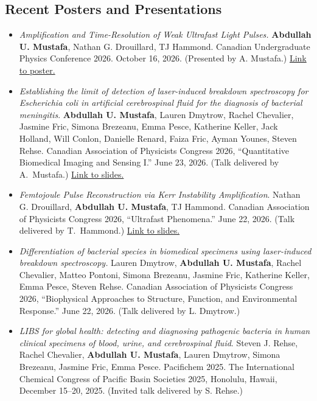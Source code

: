 \documentclass[11pt]{article}
\begin{document}
\subsection*{Recent Posters and Presentations}
\begin{itemize}
	\item \emph{Amplification and Time-Resolution of Weak Ultrafast Light Pulses.} \textbf{Abdullah U. Mustafa}, Nathan G. Drouillard, TJ Hammond. Canadian Undergraduate Physics Conference 2026. October 16, 2026. (Presented by A. Mustafa.) \href{https://aumustafa.github.io/pdfs/MustafaCUPC26.pdf}{Link to poster.}
    \item \emph{Establishing the limit of detection of laser-induced breakdown spectroscopy for \textit{Escherichia coli} in artificial cerebrospinal fluid for the diagnosis of bacterial meningitis}. \textbf{Abdullah U. Mustafa}, Lauren Dmytrow, Rachel Chevalier, Jasmine Fric, Simona Brezeanu, Emma Pesce, Katherine Keller, Jack Holland, Will Conlon, Danielle Renard, Faiza Fric, Ayman Younes, Steven Rehse. Canadian Association of Physicists Congress 2026, ``Quantitative Biomedical Imaging and Sensing I.'' June 23, 2026. (Talk delivered by A.~Mustafa.) \href{https://aumustafa.github.io/pdfs/MustafaCAP26.pdf}{Link to slides.}
    \item \emph{Femtojoule Pulse Reconstruction via Kerr Instability Amplification}. Nathan G. Drouillard, \textbf{Abdullah U. Mustafa}, TJ Hammond. Canadian Association of Physicists Congress 2026, ``Ultrafast Phenomena.'' June 22, 2026. (Talk delivered by T.~Hammond.) \href{https://aumustafa.github.io/pdfs/DrouillardCAP26.pdf}{Link to slides.}
    \item \emph{Differentiation of bacterial species in biomedical specimens using laser-induced breakdown spectroscopy.} Lauren Dmytrow, \textbf{Abdullah U. Mustafa}, Rachel Chevalier, Matteo Pontoni, Simona Brezeanu, Jasmine Fric, Katherine Keller, Emma Pesce, Steven Rehse. Canadian Association of Physicists Congress 2026, “Biophysical Approaches to Structure, Function, and Environmental Response.” June 22, 2026. (Talk delivered by L. Dmytrow.)
    \item \emph{LIBS for global health: detecting and diagnosing pathogenic bacteria in human clinical specimens of blood, urine, and cerebrospinal fluid}. Steven J. Rehse, Rachel Chevalier, \textbf{Abdullah U. Mustafa}, Lauren Dmytrow, Simona Brezeanu, Jasmine Fric, Emma Pesce. Pacifichem 2025. The International Chemical Congress of Pacific Basin Societies 2025, Honolulu, Hawaii, December 15--20, 2025. (Invited talk delivered by S. Rehse.)
\end{itemize}
\end{document}
